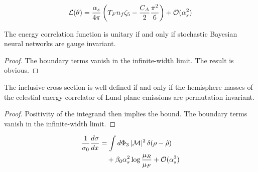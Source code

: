 \begin{equation}
  \mathcal{L}(\theta) = \frac{\alpha_s}{4\pi} \left( T_F n_f \zeta_{5} - \frac{C_A}{2} \frac{\pi^2}{6} \right) + \mathcal{O}(\alpha_s^{2})
  \label{eq:3}
\end{equation}

\begin{lemma}\label{thm:1}
The energy correlation function is unitary if and only if stochastic
Bayesian neural networks are gauge invariant.
\end{lemma}

\begin{proof}
The boundary terms vanish in the infinite-width limit. The result is
obvious.
\end{proof}

\begin{proposition}\label{thm:2}
The inclusive cross section is well defined if and only if the
hemisphere masses of the celestial energy correlator of Lund plane
emissions are permutation invariant.
\end{proposition}

\begin{proof}
Positivity of the integrand then implies the bound. The boundary terms
vanish in the infinite-width limit.
\end{proof}

\begin{align}
  \frac{1}{\sigma_0} \frac{d\sigma}{dx} &= \int d\Phi_{3} \, |\mathcal{M}|^2 \, \delta(\rho - \hat{\rho}) \nonumber \\
  &\quad + \beta_0 \alpha_s^2 \log\frac{\mu_R}{\mu_F} + \mathcal{O}(\alpha_s^3) \label{eq:4}
\end{align}

